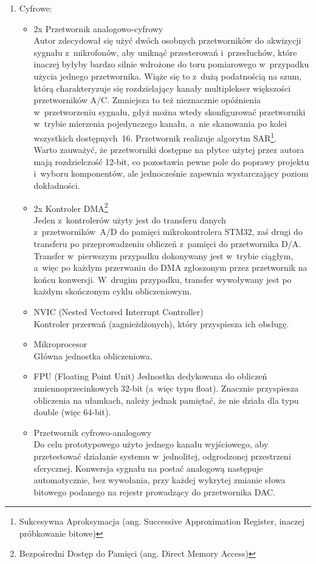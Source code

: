 \begin{enumerate}
\begin{itemize}
		\item Głośnik MG15 \SI{0.1}{\W}; \SI{8}{\ohm}
	\end{itemize}
	\item Cyfrowe:
	\begin{itemize}
		\item 2x Przetwornik analogowo-cyfrowy\\
		Autor zdecydował się użyć dwóch osobnych przetworników do akwizycji sygnału z~mikrofonów, aby uniknąć przesterowań i~przesłuchów, które inaczej byłyby bardzo silnie wdrożone do toru pomiarowego w~przypadku użycia jednego przetwornika. Wiąże się to z~dużą podatnością na szum, którą charakteryzuje się rozdzielający kanały multiplekser większości przetworników A/C. Zmniejsza to też nieznacznie opóźnienia w~przetworzeniu sygnału, gdyż można wtedy skonfigurować przetworniki w~trybie mierzenia pojedynczego kanału, a~nie skanowania po kolei wszystkich dostępnych~16. Przetwornik realizuje algorytm SAR\footnote{Sukcesywna Aproksymacja (ang. Successive Approximation Register, inaczej próbkowanie bitowe)}.\\
		Warto zauważyć, że przetworniki dostępne na płytce użytej przez autora mają rozdzielczość 12-bit, co pozostawia pewne pole do poprawy projektu i~wyboru komponentów, ale jednocześnie zapewnia wystarczający poziom dokładności.
		\item 2x Kontroler DMA\footnote{Bezpośredni Dostęp do Pamięci (ang. Direct Memory Access)}\\
		Jeden z~kontrolerów użyty jest do transferu danych z~przetworników~A/D do pamięci mikrokontrolera STM32, zaś drugi do transferu po przeprowadzeniu obliczeń z~pamięci do przetwornika D/A. Transfer w~pierwszym przypadku dokonywany jest w~trybie ciągłym, a~więc po każdym przerwaniu do DMA zgłoszonym przez przetwornik na końcu konwersji. W~drugim przypadku, transfer wywoływany jest po każdym skończonym cyklu obliczeniowym.
		\item NVIC (Nested Vectored Interrupt Controller)\\
		Kontroler przerwań (zagnieżdżonych), który przyspiesza ich obsługę.
		\item Mikroprocesor\\
		Główna jednostka obliczeniowa.
		\item FPU (Floating Point Unit)
		Jednostka dedykowana do obliczeń zmiennoprzecinkowych 32-bit (a~więc typu float). Znacznie przyspiesza obliczenia na ułamkach, należy jednak pamiętać, że nie działa dla typu double (więc 64-bit). 
		\item Przetwornik cyfrowo-analogowy\\
		Do celu prototypowego użyto jednego kanału wyjściowego, aby przetestować działanie systemu w~jednolitej, odgrodzonej przestrzeni sferycznej. Konwersja sygnału na postać analogową następuje automatycznie, bez wywołania, przy każdej wykrytej zmianie słowa bitowego podanego na rejestr prowadzący do przetwornika DAC.
	\end{itemize}
\end{enumerate}

